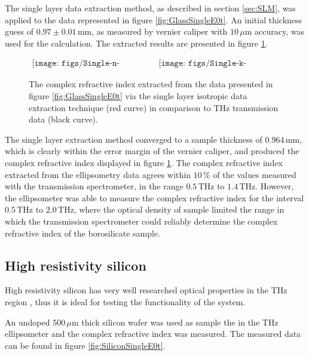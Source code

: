 The single layer data extraction method, as described in section \ref{sec:SLM}, was applied to the data represented in figure \ref{fig:GlassSingleE0t}. An initial thickness guess of $0.97\pm0.01\,$mm, as measured by vernier caliper with $10\,\mu$m accuracy, was used for the calculation. The extracted results are presented in figure \ref{fig:SingleGlassExt}.

\begin{figure}[H]
                \begin{center}$
								\begin{array}{cc}
                \texttt{[image: figs/Single-n-Thin.png]}&
                \texttt{[image: figs/Single-k-Thin.png]}
								\end{array}$
								\end{center}
	\caption[Extract complex refractive index of single layer glass sample]{The complex refractive index extracted from the data presented in figure \ref{fig:GlassSingleE0t} via the single layer isotropic data extraction technique (red curve) in comparison to THz transmission data (black curve).}
	\label{fig:SingleGlassExt}
\end{figure}

The single layer extraction method converged to a sample thickness of $0.964\,$mm, which is clearly within the error margin of the vernier caliper, and produced the complex refractive index displayed in figure \ref{fig:SingleGlassExt}. The complex refractive index extracted from the ellipsometry data agrees within $10\,\%$ of the values measured with the transmission spectrometer, in the range $0.5\,$THz to $1.4\,$THz. However, the ellipsometer was able to measure the complex refractive index for the interval $0.5\,$THz to $2.0\,$THz, where the optical density of sample limited the range in which the transmission spectrometer could reliably determine the complex refractive index of the borosilicate sample.

\subsection{High resistivity silicon}
\label{sub: HR-Silicon}

High resistivity silicon has very well researched optical properties in the THz region \cite{Li-2008,Jepsen-2007,Grischkowsky1990}, thus it is ideal for testing the functionality of the system. 

An undoped $500\,\mu$m thick silicon wafer was used as sample the in the THz ellipsometer and the complex refractive index was measured.  The measured data can be found in figure \ref{fig:SiliconSingleE0t}.

